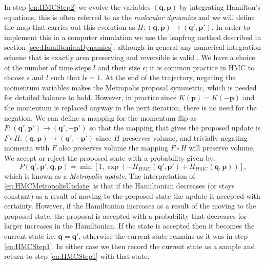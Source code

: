 \documentclass[12pt]{article}
\begin{document}
            In step \ref{en:HMCStep2} we evolve the variables $\left(\bm{q},\bm{p}\right)$ by integrating Hamilton's equations, this is often referred to as the \textit{molecular dynamics} and we will define the map that carries out this evolution as $H:\left(\bm{q},\bm{p}\right)\rightarrow\left(\bm{q}',\bm{p}'\right)$. In order to implement this in a computer simulation we use the leapfrog method described in section \ref{sec:HamiltonianDynamics}, although in general any numerical integration scheme that is exactly area preserving and reversible is valid \cite{kennedy_pendleton_2001}. We have a choice of the number of time steps $l$ and their size $\epsilon$; it is common practice in HMC to choose $\epsilon$ and $l$ such that $l\epsilon=1$. At the end of the trajectory, negating the momentum variables makes the Metropolis proposal symmetric, which is needed for detailed balance to hold. However, in practice since $K\left(\bm{p}\right)=K\left(-\bm{p}\right)$ and the momentum is replaced anyway in the next iteration, there is no need for the negation. We can define a mapping for the momentum flip as $F:\left(\bm{q}',\bm{p}'\right)\rightarrow\left(\bm{q}',-\bm{p}'\right)$ so that the mapping that gives the proposed update is $F\circ H : \left(\bm{q},\bm{p}\right)\rightarrow\left(\bm{q}',-\bm{p}'\right)$ since $H$ preserves volume, and trivially negating momenta with $F$ also preserves volume the mapping $F\circ H$ will preserve volume. We accept or reject the proposed state with a probability given by:
            \begin{equation}
                \label{eq:HMCMetropolisUpdate}
                P\left(\bm{q}',\bm{p}',\bm{q},\bm{p}\right) = \min{\left[1,\exp{\left(-H_{HMC}\left(\bm{q}',\bm{p}'\right)+ \allowbreak H_{HMC}\left(\bm{q},\bm{p}\right)\right)}\right]},
            \end{equation}
            which is known as a \textit{Metropolis update}. The interpretation of \ref{eq:HMCMetropolisUpdate} is that if the Hamiltonian decreases (or stays constant) as a result of moving to the proposed state the update is accepted with certainty. However, if the Hamiltonian increases as a result of the moving to the proposed state, the proposal is accepted with a probability that decreases for larger increases in the Hamiltonian. If the state is accepted then it becomes the current state i.e. $\bm{q} = \bm{q}'$, otherwise the current state remains as it was in step \ref{en:HMCStep1}. In either case we then record the current state as a sample and return to step \ref{en:HMCStep1} with that state.
\end{document}
